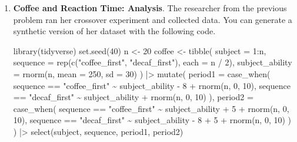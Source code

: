 \documentclass[
  letterpaper,
  DIV=11,
  numbers=noendperiod]{scrartcl}
\newenvironment{Shaded}{\begin{snugshade}}{\end{snugshade}}
\newcommand{\AttributeTok}[1]{\textcolor[rgb]{0.40,0.45,0.13}{#1}}
\newcommand{\DecValTok}[1]{\textcolor[rgb]{0.68,0.00,0.00}{#1}}
\newcommand{\FunctionTok}[1]{\textcolor[rgb]{0.28,0.35,0.67}{#1}}
\newcommand{\NormalTok}[1]{\textcolor[rgb]{0.00,0.23,0.31}{#1}}
\newcommand{\OtherTok}[1]{\textcolor[rgb]{0.00,0.23,0.31}{#1}}
\newcommand{\SpecialCharTok}[1]{\textcolor[rgb]{0.37,0.37,0.37}{#1}}
\newcommand{\StringTok}[1]{\textcolor[rgb]{0.13,0.47,0.30}{#1}}
\begin{document}
\begin{enumerate}
\def\labelenumi{\arabic{enumi}.}
\setcounter{enumi}{2}
\item
  \textbf{Coffee and Reaction Time: Analysis}. The researcher from the
  previous problem ran her crossover experiment and collected data. You
  can generate a synthetic version of her dataset with the following
  code.

\begin{Shaded}
\begin{Highlighting}[]
\FunctionTok{library}\NormalTok{(tidyverse)}
\FunctionTok{set.seed}\NormalTok{(}\DecValTok{40}\NormalTok{)}
\NormalTok{n }\OtherTok{\textless{}{-}} \DecValTok{20}
\NormalTok{coffee }\OtherTok{\textless{}{-}} \FunctionTok{tibble}\NormalTok{(}
    \AttributeTok{subject  =} \DecValTok{1}\SpecialCharTok{:}\NormalTok{n,}
    \AttributeTok{sequence =} \FunctionTok{rep}\NormalTok{(}\FunctionTok{c}\NormalTok{(}\StringTok{"coffee\_first"}\NormalTok{, }\StringTok{"decaf\_first"}\NormalTok{), }\AttributeTok{each =}\NormalTok{ n }\SpecialCharTok{/} \DecValTok{2}\NormalTok{),}
    \AttributeTok{subject\_ability =} \FunctionTok{rnorm}\NormalTok{(n, }\AttributeTok{mean =} \DecValTok{250}\NormalTok{, }\AttributeTok{sd =} \DecValTok{30}\NormalTok{)}
\NormalTok{) }\SpecialCharTok{|\textgreater{}}
    \FunctionTok{mutate}\NormalTok{(}
        \AttributeTok{period1 =} \FunctionTok{case\_when}\NormalTok{(}
\NormalTok{            sequence }\SpecialCharTok{==} \StringTok{"coffee\_first"} \SpecialCharTok{\textasciitilde{}}\NormalTok{ subject\_ability }\SpecialCharTok{{-}} \DecValTok{8} \SpecialCharTok{+} \FunctionTok{rnorm}\NormalTok{(n, }\DecValTok{0}\NormalTok{, }\DecValTok{10}\NormalTok{),}
\NormalTok{            sequence }\SpecialCharTok{==} \StringTok{"decaf\_first"}  \SpecialCharTok{\textasciitilde{}}\NormalTok{ subject\_ability }\SpecialCharTok{+} \FunctionTok{rnorm}\NormalTok{(n, }\DecValTok{0}\NormalTok{, }\DecValTok{10}\NormalTok{)}
\NormalTok{        ),}
        \AttributeTok{period2 =} \FunctionTok{case\_when}\NormalTok{(}
\NormalTok{            sequence }\SpecialCharTok{==} \StringTok{"coffee\_first"} \SpecialCharTok{\textasciitilde{}}\NormalTok{ subject\_ability }\SpecialCharTok{+} \DecValTok{5} \SpecialCharTok{+} \FunctionTok{rnorm}\NormalTok{(n, }\DecValTok{0}\NormalTok{, }\DecValTok{10}\NormalTok{),}
\NormalTok{            sequence }\SpecialCharTok{==} \StringTok{"decaf\_first"}  \SpecialCharTok{\textasciitilde{}}\NormalTok{ subject\_ability }\SpecialCharTok{{-}} \DecValTok{8} \SpecialCharTok{+} \DecValTok{5} \SpecialCharTok{+} \FunctionTok{rnorm}\NormalTok{(n, }\DecValTok{0}\NormalTok{, }\DecValTok{10}\NormalTok{)}
\NormalTok{        )}
\NormalTok{    ) }\SpecialCharTok{|\textgreater{}}
    \FunctionTok{select}\NormalTok{(subject, sequence, period1, period2)}
\end{Highlighting}
\end{Shaded}


\end{enumerate}
\end{document}
